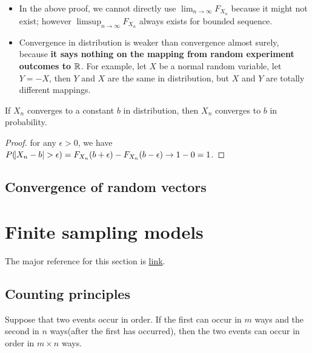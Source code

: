 \begin{refsection}
\begin{remark}\hfill
\begin{itemize}
    \item In the above proof, we cannot directly use $\lim_{n\to \infty} F_{X_n}$ because it might not exist; however $\limsup_{n\to \infty} F_{X_n}$ always exists for bounded sequence.
    \item Convergence in distribution is weaker than convergence almost surely, because \textbf{it says nothing on the mapping from random experiment outcomes to $\mathbb{R}$}. For example, let $X$ be a normal random variable, let $Y=-X$, then $Y$ and $X$ are the same in distribution, but $X$ and $Y$ are totally different mappings.
\end{itemize}
\end{remark}


\begin{theorem}
\cite[305]{hoggintroduction}If $X_n$ converges to a constant $b$ in distribution, then $X_n$ converges to $b$ in probability.
\end{theorem}
\begin{proof}
	for any $\epsilon > 0$, we have $P(\abs{X_n-b}>\epsilon) = F_{X_n}(b+\epsilon) - F_{X_n}(b-\epsilon) \to 1 - 0 =1$.
\end{proof}
 



\subsection{Convergence of random vectors}
\cite[320]{hoggintroduction}






\section{Finite sampling models}

The major reference for this section is \href{http://www.math.uah.edu/stat/urn/index.html}{link}.

\subsection{Counting principles}
\begin{theorem}\label{ch:theory-of-probability:th:FundamentalCountingPrinciple}
	Suppose that two events occur in order. If the first can occur in $m$ ways and the second in $n$ ways(after the first has occurred), then the two events can occur in order in $m\times n$ ways.
\end{theorem}


\end{refsection}
